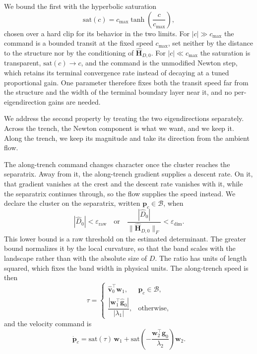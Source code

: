\documentclass[lettersize,journal]{IEEEtran}
\begin{document}
We bound the first with the hyperbolic saturation
\begin{equation}
    \mathrm{sat}(c) = c_{\max} \tanh\!\left(\frac{c}{c_{\max}}\right),
    \label{eq:sat}
\end{equation}
chosen over a hard clip for its behavior in the two limits. For $|c| \gg
c_{\max}$ the command is a bounded transit at the fixed speed $c_{\max}$,
set neither by the distance to the structure nor by the conditioning of
$\hat{\mathbf{H}}_{D,0}$. For $|c| \ll c_{\max}$ the saturation is
transparent, $\mathrm{sat}(c) \to c$, and the command is the unmodified
Newton step, which retains its terminal convergence rate instead of
decaying at a tuned proportional gain. One parameter therefore fixes both
the transit speed far from the structure and the width of the terminal
boundary layer near it, and no per-eigendirection gains are needed.

We address the second property by treating the two eigendirections
separately. Across the trench, the Newton component is what we want, and
we keep it. Along the trench, we keep its magnitude and take its
direction from the ambient flow.

The along-trench command changes character once the cluster reaches the
separatrix. Away from it, the along-trench gradient supplies a descent
rate. On it, that gradient vanishes at the crest and the descent rate
vanishes with it, while the separatrix continues through, so the flow
supplies the speed instead. We declare the cluster on the separatrix,
written $\mathbf{p}_c \in \mathcal{B}$, when
\begin{equation}
    |\hat{D}_0| < \varepsilon_{\mathrm{raw}}
    \quad\text{or}\quad
    \frac{|\hat{D}_0|}{\|\hat{\mathbf{H}}_{D,0}\|_F}
        < \varepsilon_{\dim}.
    \label{eq:flow_band}
\end{equation}
This lower bound is a raw threshold on the estimated determinant. The
greater bound normalizes it by the local curvature, so that the band scales
with the landscape rather than with the absolute size of $D$. The ratio
has units of length squared, which fixes the band width in physical
units. The along-trench speed is then
\begin{equation}
    \tau =
    \begin{cases}
        \hat{\mathbf{v}}_0^\top \mathbf{w}_1,
            & \mathbf{p}_c \in \mathcal{B}, \\[6pt]
        \dfrac{|\mathbf{w}_1^\top \hat{\mathbf{g}}_0|}{|\lambda_1|},
            & \text{otherwise},
    \end{cases}
    \label{eq:tau}
\end{equation}
and the velocity command is
\begin{equation}
    \dot{\mathbf{p}}_c =
    \mathrm{sat}(\tau)\,\mathbf{w}_1
    + \mathrm{sat}\!\left(-\frac{\mathbf{w}_2^\top
      \hat{\mathbf{g}}_0}{\lambda_2}\right)\mathbf{w}_2.
    \label{eq:d_law}
\end{equation}
\end{document}
